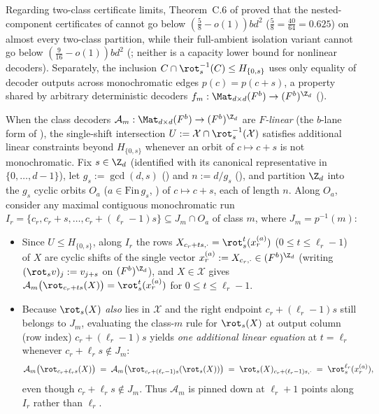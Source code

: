 Regarding two-class certificate limits, Theorem~C.6 of \cite{SharedDecoders2026} proved that the
nested-component certificates of \cite{SharedDecoders2026} cannot go below
$(\frac{5}{8} - o(1)) b d^2$ ($\frac{5}{8} = \frac{40}{64} = 0.625$) on almost every two-class
partition, while their full-ambient isolation variant cannot go below $(\frac{9}{16} - o(1)) b d^2$
(\cite[Theorem~C.7]{SharedDecoders2026}; neither is a capacity lower bound for nonlinear decoders).
Separately, the inclusion $C \cap \rot_s^{-1}(C) \le H_{\{0, s\}}$ uses only equality of decoder
outputs across monochromatic edges $p(c) = p(c + s)$, a property shared by arbitrary deterministic
decoders $f_m : \Mat_{d\times d}(F^b) \to (F^b)^{\Z_d}$ ().

When the class decoders $\mathcal{A}_m : \Mat_{d\times d}(F^b) \to (F^b)^{\Z_d}$ are \emph{$F$-linear}
(the $b$-lane form of \cite[Definition~6.3]{SeventeenthPaper2026}), the single-shift intersection
$U := \mathcal{X} \cap \rot_s^{-1}(\mathcal{X})$ satisfies additional linear constraints beyond
$H_{\{0, s\}}$ whenever an orbit of $c \mapsto c + s$ is not monochromatic. Fix $s \in \Z_d$
(identified with its canonical representative in $\{0,\dots,d-1\}$), let $g_s := \gcd(d, s)$
() and $n := d / g_s$ (), and partition $\Z_d$ into the $g_s$
cyclic orbits $O_a$ ($a \in \mathrm{Fin}\,g_s$, ) of $c \mapsto c + s$, each of
length $n$. Along $O_a$, consider any maximal contiguous monochromatic run
$I_r = \{c_r, c_r + s, \dots, c_r + (\ell_r - 1)s\} \subseteq J_m \cap O_a$ of class $m$, where
$J_m = p^{-1}(m)$:
\begin{itemize}[leftmargin=1.5em]
\item Since $U \le H_{\{0, s\}}$, along $I_r$ the rows $X_{c_r + t s, \cdot} = \rot_s^t(x^{(a)}_r)$
  ($0 \le t \le \ell_r - 1$) of $X$ are cyclic shifts of the single vector
  $x^{(a)}_r := X_{c_r, \cdot} \in (F^b)^{\Z_d}$ (writing $(\rot_s v)_j := v_{j + s}$ on
  $(F^b)^{\Z_d}$), and $X \in \mathcal{X}$ gives
  $\mathcal{A}_m\bigl(\rot_{c_r + t s}(X)\bigr) = \rot_s^t(x^{(a)}_r)$ for $0 \le t \le \ell_r - 1$.
\item Because $\rot_s(X)$ \emph{also} lies in $\mathcal{X}$ and the right endpoint
  $c_r + (\ell_r - 1)s$ still belongs to $J_m$, evaluating the class-$m$ rule for $\rot_s(X)$ at
  output column (row index) $c_r + (\ell_r - 1)s$ yields \emph{one additional linear equation} at
  $t = \ell_r$ whenever $c_r + \ell_r s \notin J_m$:
  \[
    \mathcal{A}_m\bigl(\rot_{c_r + \ell_r s}(X)\bigr)
    \;=\;
    \mathcal{A}_m\bigl(\rot_{c_r + (\ell_r - 1)s}(\rot_s(X))\bigr)
    \;=\;
    \rot_s(X)_{c_r + (\ell_r - 1)s, \cdot}
    \;=\;
    \rot_s^{\ell_r}(x^{(a)}_r),
  \]
  even though $c_r + \ell_r s \notin J_m$. Thus $\mathcal{A}_m$ is pinned down at $\ell_r + 1$ points
  along $I_r$ rather than $\ell_r$.
\end{itemize}

